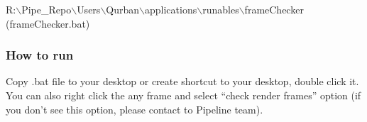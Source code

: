R:$\backslash$Pipe\_Repo$\backslash$Users$\backslash$Qurban$\backslash$applications$\backslash$runables$\backslash$frameChecker (frameChecker.bat)

\subsubsection*{How to run}  

Copy .bat file to your desktop or create shortcut to your desktop, double click it. You can also right click the any frame and select “check render frames” option (if you don’t see this option, please contact to Pipeline team).

